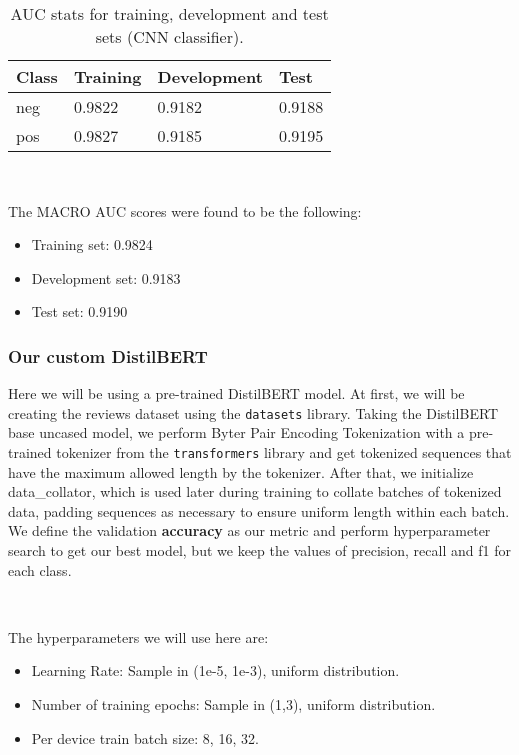 \documentclass[10pt, a4paper]{article}
\begin{document}
	\begin{table}
		\begin{tabular}{|l|l|l|l|}
			\hline
			\cellcolor{blue!25}\textbf{Class} & \cellcolor{blue!25}\textbf{Training} & \cellcolor{blue!25}\textbf{Development} & \cellcolor{blue!25}\textbf{Test}\\
			\hline
			neg & 0.9822 & 0.9182 & 0.9188 \\\hline
			pos & 0.9827 & 0.9185 & 0.9195 \\\hline
			
		\end{tabular}
		\centering
		\caption{AUC stats for training, development and test sets (CNN classifier).}
		\label{tab::ex-2-stats-auc}
	\end{table}
	\
	
	The MACRO AUC scores were found to be the following:
	\begin{itemize}
		\item Training set: 0.9824
		\item Development set: 0.9183
		\item Test set: 0.9190
	\end{itemize}

        \subsubsection{Our custom DistilBERT}
        
        Here we will be using a pre-trained DistilBERT model. At first, we will be creating the reviews dataset using the \texttt{datasets} library. Taking the DistilBERT base uncased model, we perform Byter Pair Encoding Tokenization with a pre-trained tokenizer from the \texttt{transformers} library and get tokenized sequences that have the maximum allowed length by the tokenizer. After that, we initialize data\_collator, which is used later during training to collate batches of tokenized data, padding sequences as necessary to ensure uniform length within each batch. We define the validation \textbf{accuracy} as our metric and perform hyperparameter search to get our best model, but we keep the values of precision, recall and f1 for each class. 
        \ 
        
        \
 
    The hyperparameters we will use here are:
    \begin{itemize}
        \item Learning Rate: Sample in (1e-5, 1e-3), uniform distribution.
        \item Number of training epochs: Sample in (1,3), uniform distribution.
        \item Per device train batch size: 8, 16, 32.
        
    \end{itemize}
\end{document}
